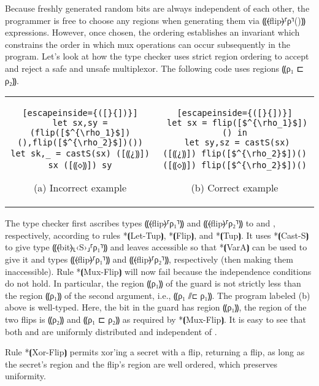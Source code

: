 Because freshly generated random bits are always independent of each other, the
programmer is free to choose any regions when generating them via ⸨⦑flip⦒⸢ρ⸣()⸩
expressions. However, once chosen, the ordering establishes an invariant which
constrains the order in which mux operations can occur subsequently in the
program.
Let's look at how the type checker uses strict region ordering to accept and reject a safe and unsafe
multiplexor. The following code uses regions ⸨ρ₁ ⊏ ρ₂⸩.
\begin{center}
\begin{tabular}{cc}
\begin{minipage}{0.35\textwidth}
\begin{lstlisting}[escapeinside={([}{])}]
let sx,sy = (flip([$^{\rho_1}$])(),flip([$^{\rho_2}$])())
let sk,_ = castS(sx) ([⸨¿⸩]) sx ([⸨◇⸩]) sy
\end{lstlisting}
{\small (a) Incorrect example}
\end{minipage}
&
\begin{minipage}{0.45\textwidth}
\begin{lstlisting}[escapeinside={([}{])}]
 let sx = flip([$^{\rho_1}$])() in
 let sy,sz = castS(sx) ([⸨¿⸩]) flip([$^{\rho_2}$])() ([⸨◇⸩]) flip([$^{\rho_2}$])()
\end{lstlisting}
{\small (b) Correct example}
\end{minipage}
\end{tabular}
\end{center}
The type checker first ascribes types ⸨⦑flip⦒⸢{ρ₁}⸣⸩ and
⸨⦑flip⦒⸢{ρ₂}⸣⸩ to  and , respectively, according to
rules *⦗Let-Tup⦘, *⦗Flip⦘, and *⦗Tup⦘. It uses *⦗Cast-S⦘ to give
 type ⸨⦑bit⦒⸤‹S›⸥⸢{ρ₁}⸣⸩ and leaves 
accessible so that *⦗VarA⦘ can be used to give it and  types
⸨⦑flip⦒⸢{ρ₁}⸣⸩ and ⸨⦑flip⦒⸢{ρ₂}⸣⸩, respectively (then making them
inaccessible). Rule *⦗Mux-Flip⦘ will now fail because the independence
conditions do not hold. In particular, the region ⸨ρ₁⸩ of the
guard is not strictly less than the region ⸨ρ₁⸩ of the second
argument, i.e., ⸨ρ₁ ⫽⊏ ρ₁⸩.
%
The program labeled (b) above is well-typed.
Here, the bit in
the guard has region ⸨ρ₁⸩, the region of the two flips is ⸨ρ₂⸩ and ⸨ρ₁
⊏ ρ₂⸩ as required by *⦗Mux-Flip⦘. It is easy
to see that both  and
 are uniformly distributed and independent of .

Rule *⦗Xor-Flip⦘ permits xor'ing a secret with a flip, returning a
flip, as long as the secret's region and the flip's region are
well ordered, which preserves uniformity.

